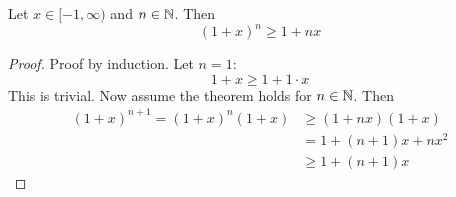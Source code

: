 \documentclass[../../script.tex]{subfiles}
\begin{document}
\begin{thm}\label{thm:bernoulli}
Let $x \in [-1, \infty)$ and $n \in \mathbb{N}$. Then
\[
	(1 + x)^n \ge 1 + nx
\]
\end{thm}
\begin{proof}
Proof by induction. Let $n = 1$:
\begin{equation}
	1 + x \ge 1 + 1\cdot x
\end{equation}
This is trivial. Now assume the theorem holds for $n \in \mathbb{N}$. Then
\begin{equation}
\begin{split}
	(1 + x)^{n+1} = (1+x)^n (1+x) &\ge (1 + nx)(1 + x) \\
	&= 1 + (n+1)x + nx^2 \\
	&\ge 1 + (n+1)x
\end{split}
\end{equation}
\end{proof}
\end{document}
